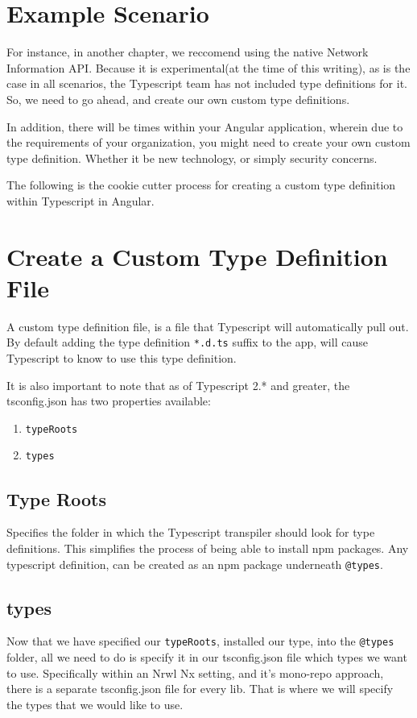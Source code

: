 \section{Example Scenario}
For instance, in another chapter, we reccomend using the native Network 
Information API. Because it is experimental(at the time of this writing),
as is the case in all scenarios, the Typescript team has not included 
type definitions for it. So, we need to go ahead, and create our own 
custom type definitions. 

In addition, there will be times within your Angular application, wherein 
due to the requirements of your organization, you might need to create your 
own custom type definition. Whether it be new technology, or simply security
concerns. 

The following is the cookie cutter process for creating a custom type 
definition within Typescript in Angular. 

\section{Create a Custom Type Definition File}
A custom type definition file, is a file that Typescript will automatically 
pull out. By default adding the type definition \lstinline{*.d.ts} suffix to
the app, will cause Typescript to know to use this type definition.

It is also important to note that as of Typescript 2.* and greater, the
tsconfig.json has two properties available: 
\begin{enumerate}
  \item \lstinline{typeRoots}
  \item \lstinline{types}
\end{enumerate}

\subsection{Type Roots}
Specifies the folder in which the Typescript transpiler should look for type 
definitions. This simplifies the process of being able to install npm packages.
Any typescript definition, can be created as an npm package underneath \lstinline{@types}.

\subsection{types}
Now that we have specified our \lstinline{typeRoots}, installed our type, into 
the \lstinline{@types} folder, all we need to do is specify it in our 
tsconfig.json file which types we want to use. Specifically within an Nrwl Nx 
setting, and it's mono-repo approach, there is a separate tsconfig.json file 
for every lib. That is where we will specify the types that we would like to 
use. 

